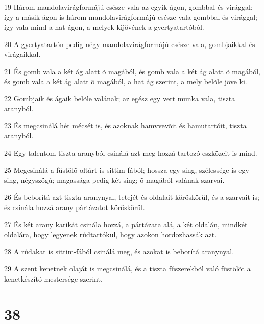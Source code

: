 \par 19 Három mandolavirágformájú csésze vala az egyik ágon, gombbal és virággal; így a másik ágon is három mandolavirágformájú csésze vala gombbal és virággal; így vala mind a hat ágon, a melyek kijövének a gyertyatartóból.
\par 20 A gyertyatartón pedig négy mandolavirágformájú csésze vala, gombjaikkal és virágaikkal.
\par 21 És gomb vala a két ág alatt õ magából, és gomb vala a két ág alatt õ magából, és gomb vala a két ág alatt õ magából, a hat ág szerint, a mely belõle jöve ki.
\par 22 Gombjaik és ágaik belõle valának; az egész egy vert munka vala, tiszta aranyból.
\par 23 És megcsinálá hét mécsét is, és azoknak hamvvevõit és hamutartóit, tiszta aranyból.
\par 24 Egy talentom tiszta aranyból csinálá azt meg hozzá tartozó eszközeit is mind.
\par 25 Megcsinálá a füstölõ oltárt is sittim-fából; hossza egy sing, szélessége is egy sing, négyszögû; magassága pedig két sing; õ magából valának szarvai.
\par 26 És beborítá azt tiszta aranynyal, tetejét és oldalait köröskörül, és a szarvait is; és csinála hozzá arany pártázatot köröskörül.
\par 27 És két arany karikát csinála hozzá, a pártázata alá, a két oldalán, mindkét oldalára, hogy legyenek rúdtartókul, hogy azokon hordozhassák azt.
\par 28 A rúdakat is sittim-fából csinálá meg, és azokat is beborítá aranynyal.
\par 29 A szent kenetnek olaját is megcsinálá, és a tiszta fûszerekbõl való füstölõt a kenetkészítõ mestersége szerint.

\chapter{38}

